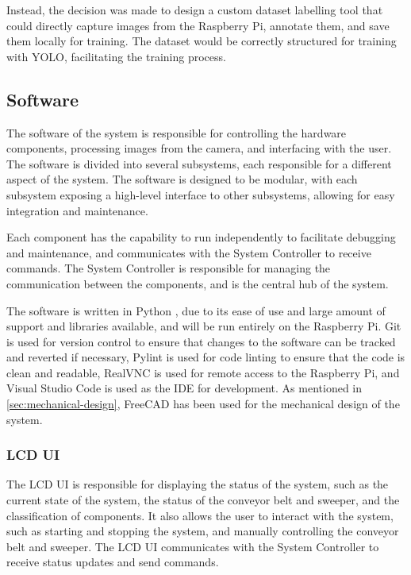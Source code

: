 Instead, the decision was made to design a custom dataset labelling tool that could directly capture images from the Raspberry Pi, annotate them, and save them locally for training. The dataset would be correctly structured for training with YOLO, facilitating the training process.

\subsection{Software}
\label{sec:electronics-and-software-integration}
The software of the system is responsible for controlling the hardware components, processing images from the camera, and interfacing with the user. The software is divided into several subsystems, each responsible for a different aspect of the system. The software is designed to be modular, with each subsystem exposing a high-level interface to other subsystems, allowing for easy integration and maintenance.

Each component has the capability to run independently to facilitate debugging and maintenance, and communicates with the System Controller to receive commands. The System Controller is responsible for managing the communication between the components, and is the central hub of the system.

The software is written in Python \cite{python}, due to its ease of use and large amount of support and libraries available, and will be run entirely on the Raspberry Pi. Git \cite{git} is used for version control to ensure that changes to the software can be tracked and reverted if necessary, Pylint \cite{pylint} is used for code linting to ensure that the code is clean and readable, RealVNC \cite{realvnc} is used for remote access to the Raspberry Pi, and Visual Studio Code \cite{vscode} is used as the IDE for development. As mentioned in \autoref{sec:mechanical-design}, FreeCAD \cite{freecad} has been used for the mechanical design of the system.

\subsubsection{LCD UI}
The LCD UI is responsible for displaying the status of the system, such as the current state of the system, the status of the conveyor belt and sweeper, and the classification of components. It also allows the user to interact with the system, such as starting and stopping the system, and manually controlling the conveyor belt and sweeper. The LCD UI communicates with the System Controller to receive status updates and send commands.

